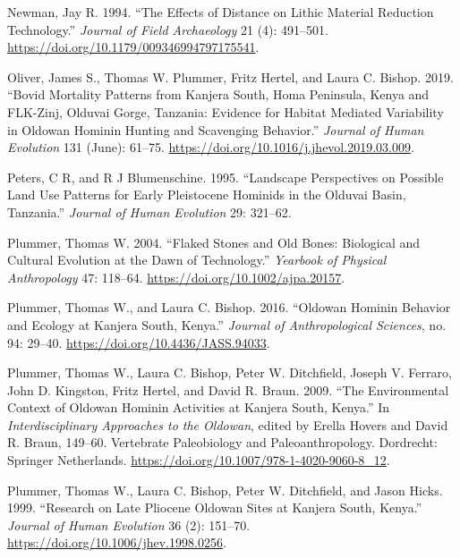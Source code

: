 \documentclass[]{elsarticle} %
\begin{document}
\leavevmode\hypertarget{ref-newmanEffectsDistanceLithic1994}{}%
Newman, Jay R. 1994. ``The Effects of Distance on Lithic Material
Reduction Technology.'' \emph{Journal of Field Archaeology} 21 (4):
491--501. \url{https://doi.org/10.1179/009346994797175541}.

\leavevmode\hypertarget{ref-oliverBovidMortalityPatterns2019}{}%
Oliver, James S., Thomas W. Plummer, Fritz Hertel, and Laura C. Bishop.
2019. ``Bovid Mortality Patterns from Kanjera South, Homa Peninsula,
Kenya and FLK-Zinj, Olduvai Gorge, Tanzania: Evidence for Habitat
Mediated Variability in Oldowan Hominin Hunting and Scavenging
Behavior.'' \emph{Journal of Human Evolution} 131 (June): 61--75.
\url{https://doi.org/10.1016/j.jhevol.2019.03.009}.

\leavevmode\hypertarget{ref-petersLandscapePerspectivesPossible1995}{}%
Peters, C R, and R J Blumenschine. 1995. ``Landscape Perspectives on
Possible Land Use Patterns for Early Pleistocene Hominids in the Olduvai
Basin, Tanzania.'' \emph{Journal of Human Evolution} 29: 321--62.

\leavevmode\hypertarget{ref-plummerFlakedStonesOld2004}{}%
Plummer, Thomas W. 2004. ``Flaked Stones and Old Bones: Biological and
Cultural Evolution at the Dawn of Technology.'' \emph{Yearbook of
Physical Anthropology} 47: 118--64.
\url{https://doi.org/10.1002/ajpa.20157}.

\leavevmode\hypertarget{ref-plummerOldowanHomininBehavior2016}{}%
Plummer, Thomas W., and Laura C. Bishop. 2016. ``Oldowan Hominin
Behavior and Ecology at Kanjera South, Kenya.'' \emph{Journal of
Anthropological Sciences}, no. 94: 29--40.
\url{https://doi.org/10.4436/JASS.94033}.

\leavevmode\hypertarget{ref-plummerEnvironmentalContextOldowan2009}{}%
Plummer, Thomas W., Laura C. Bishop, Peter W. Ditchfield, Joseph V.
Ferraro, John D. Kingston, Fritz Hertel, and David R. Braun. 2009. ``The
Environmental Context of Oldowan Hominin Activities at Kanjera South,
Kenya.'' In \emph{Interdisciplinary Approaches to the Oldowan}, edited
by Erella Hovers and David R. Braun, 149--60. Vertebrate Paleobiology
and Paleoanthropology. Dordrecht: Springer Netherlands.
\url{https://doi.org/10.1007/978-1-4020-9060-8_12}.

\leavevmode\hypertarget{ref-plummerResearchLatePliocene1999}{}%
Plummer, Thomas W., Laura C. Bishop, Peter W. Ditchfield, and Jason
Hicks. 1999. ``Research on Late Pliocene Oldowan Sites at Kanjera South,
Kenya.'' \emph{Journal of Human Evolution} 36 (2): 151--70.
\url{https://doi.org/10.1006/jhev.1998.0256}.
\end{document}
